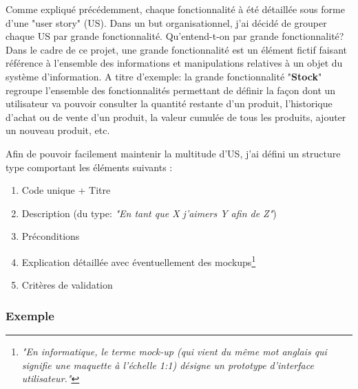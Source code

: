 Comme expliqué précédemment, chaque fonctionnalité à été détaillée sous forme d'une "user story" (US). Dans un but organisationnel, j'ai décidé de grouper chaque US par grande fonctionnalité. Qu'entend-t-on par grande fonctionnalité? Dans le cadre de ce projet, une grande fonctionnalité est un élément fictif faisant référence à l'ensemble des informations et manipulations relatives à un objet du système d'information. A titre d'exemple: la grande fonctionnalité "\textbf{Stock}" regroupe l'ensemble des fonctionnalités permettant de définir la façon dont un utilisateur va pouvoir consulter la quantité restante d'un produit, l'historique d'achat ou de vente d'un produit, la valeur cumulée de tous les produits, ajouter un nouveau produit, etc. 

\newpara

Afin de pouvoir facilement maintenir la multitude d'US, j'ai défini un structure type comportant les éléments suivants :
\begin{enumerate}
  \item Code unique + Titre
  \item Description (du type: \textit{"En tant que X j'aimers Y afin de Z"})
  \item Préconditions
  \item Explication détaillée avec éventuellement des mockups\footnote{\textit{"En informatique, le terme mock-up (qui vient du même mot anglais qui signifie une maquette à l'échelle 1:1) désigne un prototype d'interface utilisateur."}\cite{Mock}}
  \item Critères de validation
\end{enumerate}

\newpage

\subsubsection{Exemple}

